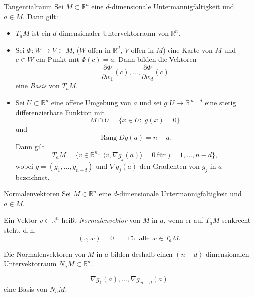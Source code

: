 \begin{satz}{Tangentialraum}
    Sei $M\subset\mathbb{R}^n$ eine $d$-dimensionale Untermannigfaltigkeit und $a\in M$. Dann gilt:
    \begin{itemize}
        \item[a)] $T_aM$ ist ein $d$-dimensionaler Untervektorraum von $\mathbb{R}^n$.
        \item[b)] Sei $\Phi:W\to V\subset M$, ($W$ offen in $\mathbb{R}^d$, $V$ offen in $M$) eine Karte von $M$ und $c\in W$ ein Punkt mit $\Phi(c)=a$. Dann bilden die Vektoren
            $$
            \frac{\partial\Phi}{\partial w_1}(c),\dots,\frac{\partial\Phi}{\partial w_d}(c)
            $$
            eine \emph{Basis} von $T_aM$.
        \item[c)] Sei $U\subset\mathbb{R}^n$ eine offene Umgebung von $a$ und sei $g:U\to\mathbb{R}^{\,n-d}$ eine stetig differenzierbare Funktion mit
            $$
            M\cap U=\{x\in U:\; g(x)=0\}
            $$
            und
            $$
            \operatorname{Rang} Dg(a)=n-d.
            $$
            Dann gilt
            $$
            T_aM=\{v\in\mathbb{R}^n:\;\langle v,\nabla g_j(a)\rangle = 0\ \text{für } j=1,\dots,n-d\},
            $$
            wobei $g=(g_1,\dots,g_{n-d})$ und $\nabla g_j(a)$ den Gradienten von $g_j$ in $a$ bezeichnet.
    \end{itemize}   
\end{satz}

\begin{definition}{Normalenvektoren}
    Sei $M\subset\mathbb{R}^n$ eine $d$-dimensionale Untermannigfaltigkeit und $a\in M$.
    \vspace{1em}

    Ein Vektor $v\in\mathbb{R}^n$ heißt \emph{Normalenvektor} von $M$ in $a$, wenn er auf $T_aM$ senkrecht steht, d.\,h.
    $$
    (v,w)=0\qquad\text{für alle }w\in T_aM.
    $$

    Die Normalenvektoren von $M$ in $a$ bilden deshalb einen $(n-d)$-dimensionalen Untervektorraum $N_aM\subset\mathbb{R}^n$.

    $$
    \nabla g_1(a),\dots,\nabla g_{\,n-d}(a)
    $$
    eine Basis von $N_aM$.
\end{definition}